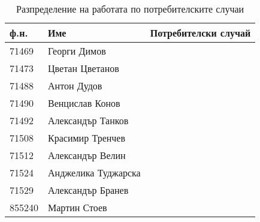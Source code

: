 \documentclass[]{article}
\begin{document}
\begin{table}[h]
\centering
\caption{Разпределение на работата по потребителските случаи}
\label{my-label}
\begin{tabular}{|l|l|l|}
\hline
\textbf{ф.н.} & \textbf{Име}        & \textbf{Потребителски случай}									\\ \hline
71469         & Георги Димов        & 																\\ \hline
71473         & Цветан Цветанов     & 																\\ \hline
71488         & Антон Дудов         & 																\\ \hline
71490         & Венцислав Конов     & 																\\ \hline
71492         & Александър Танков   & 																\\ \hline
71508         & Красимир Тренчев    & 																\\ \hline
71512         & Александър Велин    & 																\\ \hline
71524         & Анджелика Туджарска & 																\\ \hline
71529         & Александър Бранев   & 																\\ \hline
855240        & Мартин Стоев        & 																\\ \hline
\end{tabular}
\end{table}
\end{document}
